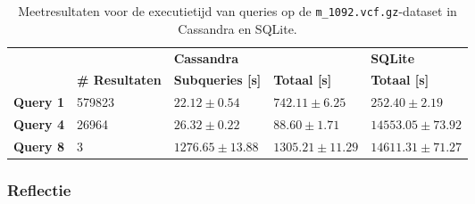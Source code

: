 \begin{table}[h]
\centering
\begin{tabular}{@{}lllll@{}}
\cmidrule(l){3-5}
                              &         & \multicolumn{2}{|l|}{\textbf{Cassandra}}                                                      & \multicolumn{1}{l|}{\textbf{SQLite}}                             \\ 
\cmidrule(l){2-5}
\multicolumn{1}{l|}{}  & \multicolumn{1}{l|}{\textbf{\# Resultaten}}               & \multicolumn{1}{l|}{\textbf{Subqueries [s]}} & \multicolumn{1}{l|}{\textbf{Totaal [s]}} & \multicolumn{1}{l|}{\textbf{Totaal [s]}} \\ \midrule
\multicolumn{1}{|l|}{\textbf{Query 1}} & \multicolumn{1}{l|}{579823} & \multicolumn{1}{l|}{$22.12 \pm 0.54$}             & \multicolumn{1}{l|}{$742.11 \pm 6.25$}          & \multicolumn{1}{l|}{$252.40 \pm 2.19$}                         \\
\multicolumn{1}{|l|}{\textbf{Query 4}} & \multicolumn{1}{l|}{26964} &\multicolumn{1}{l|}{$26.32 \pm 0.22$}            & \multicolumn{1}{l|}{$88.60 \pm 1.71$}            & \multicolumn{1}{l|}{$14553.05 \pm 73.92$}                         \\
\multicolumn{1}{|l|}{\textbf{Query 8}} & \multicolumn{1}{l|}{3} &\multicolumn{1}{l|}{$1276.65 \pm 13.88$} & \multicolumn{1}{l|}{$1305.21 \pm 11.29$}       & \multicolumn{1}{l|}{$14611.31 \pm 71.27$}                                \\ 
\bottomrule
\end{tabular}
\caption{Meetresultaten voor de executietijd van queries op de \texttt{m\_1092.vcf.gz}-dataset in Cassandra en SQLite.}
\end{table}

\subsubsection{Reflectie}

